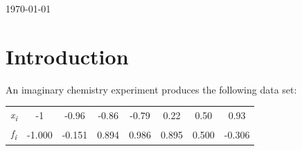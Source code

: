 \documentclass{article}
\begin{document}
\begin{titlepage}
\begin{minipage}{0.4\textwidth}
\begin{flushright}
		\end{flushright}
	\end{minipage}
	
	
	
	\vfill\vfill\vfill %
	
	{\large\today} %
	
	
	 
	
	\vfill %
	
\end{titlepage}


\section{Introduction}\label{sec:intro}
An imaginary chemistry experiment produces the following data set:

  \begin{table}[!ht]
    \large        %
    \centering    %
    \begin{tabular}{|c|c|c|c|c|c|c|c|}
    \hline
    \it{x}\textsubscript{i}&-1&-0.96&-0.86&-0.79&0.22&0.50&0.93\\     %
    \it{f}\textsubscript{i}&-1.000&-0.151&0.894&0.986&0.895&0.500&-0.306\\
    \hline        %
    \end{tabular}
  \end{table}
\end{document}
